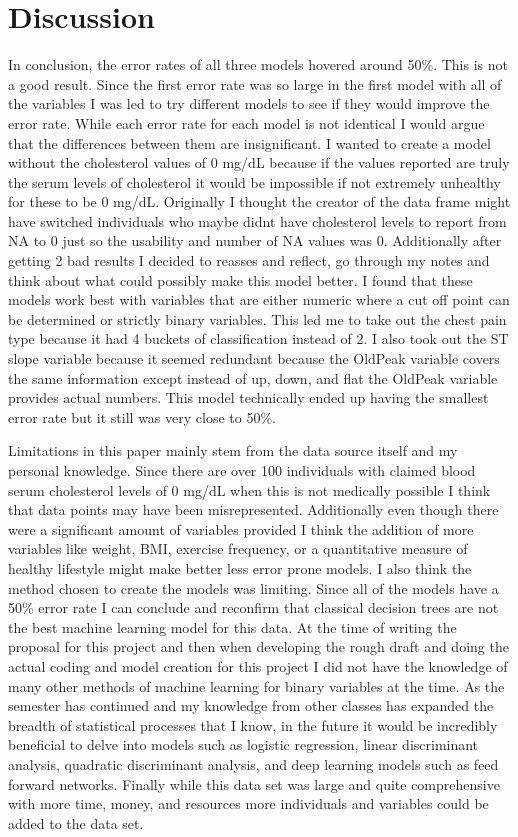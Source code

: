 \documentclass[12pt]{article}
\begin{document}
\section{Discussion}
\label{sec:disc}

In conclusion, the error rates of all three models hovered around 50\%. This is not a good result. Since the first error rate was so large in the first model with all of the variables I was led to try different models to see if they would improve the error rate. While each error rate for each model is not identical I would argue that the differences between them are insignificant. I wanted to create a model without the cholesterol values of 0 mg/dL because if the values reported are truly the serum levels of cholesterol it would be impossible if not extremely unhealthy for these to be 0 mg/dL. Originally I thought the creator of the data frame might have switched individuals who maybe didn\textsc{}t have cholesterol levels to report from NA to 0 just so the usability and number of NA values was 0. Additionally after getting 2 bad results I decided to reasses and reflect, go through my notes and think about what could possibly make this model better. I found that these models work best with variables that are either numeric where a cut off point can be determined or strictly binary variables. This led me to take out the chest pain type because it had 4 buckets of classification instead of 2. I also took out the ST slope variable because it seemed redundant because the OldPeak variable covers the same information except instead of up, down, and flat the OldPeak variable provides actual numbers. This model technically ended up having the smallest error rate but it still was very close to 50\%. \par 
Limitations in this paper mainly stem from the data source itself and my personal knowledge. Since there are over 100 individuals with claimed blood serum cholesterol levels of 0 mg/dL when this is not medically possible I think that data points may have been misrepresented. Additionally even though there were a significant amount of variables provided I think the addition of more variables like weight, BMI, exercise frequency, or a quantitative measure of healthy lifestyle might make better less error prone models. I also think the method chosen to create the models was limiting. Since all of the models have a 50\% error rate I can conclude and reconfirm that classical decision trees are not the best machine learning model for this data. At the time of writing the proposal for this project and then when developing the rough draft and doing the actual coding and model creation for this project I did not have the knowledge of many other methods of machine learning for binary variables at the time. As the semester has continued and my knowledge from other classes has expanded the breadth of statistical processes that I know, in the future it would be incredibly beneficial to delve into models such as logistic regression, linear discriminant analysis, quadratic discriminant analysis, and deep learning models such as feed forward networks. Finally while this data set was large and quite comprehensive with more time, money, and resources more individuals and variables could be added to the data set. \par
\end{document}
